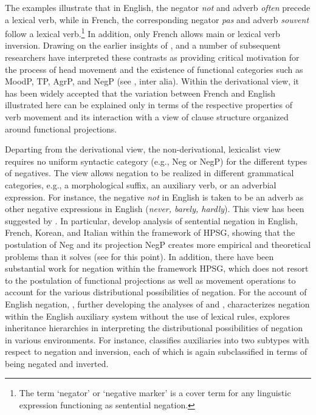 \documentclass[output=paper
                ,modfonts
		,nonflat
	        ,collection
	        ,collectionchapter
	        ,collectiontoclongg
 	        ,biblatex  
                ,babelshorthands
                ,newtxmath
                ,draftmode
                ,colorlinks, citecolor=brown 
]{./langsci/langscibook}
\begin{document}
{The examples illustrate that in English, the negator \emph{not}
and adverb \emph{often} precede a lexical verb, while in French,
the corresponding negator \textit{pas} and adverb \textit{souvent} follow
a lexical verb.\footnote{The term `negator' or `negative marker' is a cover term for
any linguistic expression functioning as sentential negation.}
 In addition, only French allows main or lexical verb inversion. Drawing on the earlier insights of \citet{Emonds:78},
\citet{Pollock:89,Pollock:94} and a number of subsequent researchers
have interpreted these contrasts as providing critical motivation for
the process of head movement and the existence of functional
categories such as MoodP, TP, AgrP, and NegP (see \citep{Belletti:90, Zanuttini:91, Zanuttini:97,Zanuttini:01, Chomsky:91,Chomsky:93,Chomsky:95, Lasnik:95, Haegeman:95,Haegeman:97, Vikner97a-u, Zeijlstra:15}, inter alia).
Within the derivational view, it has been widely
accepted that the variation between French and English illustrated
here can be explained only in terms of the respective properties
of verb movement and its interaction with a view of clause
structure organized around functional projections.


Departing from the derivational view, the non-derivational, lexicalist view
requires no uniform syntactic category (e.g., Neg or NegP) for the different types of negatives. The view allows negation to be realized in different grammatical categories, e.g., a morphological suffix, an auxiliary verb, or an adverbial expression. For instance, the negative {\it not} in English is taken to be an adverb as other negative expressions in English ({\it never, barely, hardly}). This view has been suggested by \citet{Jackendoff:72, Baker:91, Ernst:92, AG:97, Kim:00, Warner2000a-u}. In particular,
\citet{KS:96, Kim:00, KS:02} develop analysis of sentential negation in English, French, Korean, and Italian within the framework of HPSG, showing that the postulation of Neg and its projection NegP creates more empirical and theoretical problems than it solves (see \citep{Newmeyer:2006} for this point).
In addition, there have been substantial work for negation within the framework HPSG, which
does not resort to the postulation of functional projections as well as movement operations to account for the various distributional possibilities
of negation.  For the account of English negation, \citet{Warner2000a-u},
further developing the analyses of \citet{KS:96} and \citet{Kim:00},
characterizes negation within the English auxiliary system without the use of lexical rules, explores inheritance hierarchies in interpreting the distributional possibilities of negation in various environments. For instance, \citet{Warner2000a-u} classifies auxiliaries into two subtypes with respect to negation and inversion, each of which is again subclassified in terms of being negated and inverted.

}
\end{document}
